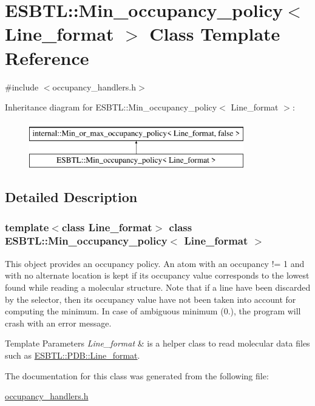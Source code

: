 \hypertarget{classESBTL_1_1Min__occupancy__policy}{}\section{E\+S\+B\+TL\+:\+:Min\+\_\+occupancy\+\_\+policy$<$ Line\+\_\+format $>$ Class Template Reference}
\label{classESBTL_1_1Min__occupancy__policy}


{\ttfamily \#include $<$occupancy\+\_\+handlers.\+h$>$}

Inheritance diagram for E\+S\+B\+TL\+:\+:Min\+\_\+occupancy\+\_\+policy$<$ Line\+\_\+format $>$\+:\begin{figure}[H]
\begin{center}
\leavevmode
\includegraphics[height=2.000000cm]{classESBTL_1_1Min__occupancy__policy}
\end{center}
\end{figure}


\subsection{Detailed Description}
\subsubsection*{template$<$class Line\+\_\+format$>$\newline
class E\+S\+B\+T\+L\+::\+Min\+\_\+occupancy\+\_\+policy$<$ Line\+\_\+format $>$}

This object provides an occupancy policy. An atom with an occupancy != 1 and with no alternate location is kept if its occupancy value corresponds to the lowest found while reading a molecular structure. Note that if a line have been discarded by the selector, then its occupancy value have not been taken into account for computing the minimum. In case of ambiguous minimum (0.), the program will crash with an error message. 
\begin{DoxyTemplParams}{Template Parameters}
{\em Line\+\_\+format} & is a helper class to read molecular data files such as \hyperlink{classESBTL_1_1PDB_1_1Line__format}{E\+S\+B\+T\+L\+::\+P\+D\+B\+::\+Line\+\_\+format}. \\
\hline
\end{DoxyTemplParams}


The documentation for this class was generated from the following file\+:\begin{DoxyCompactItemize}
\item 
\hyperlink{occupancy__handlers_8h}{occupancy\+\_\+handlers.\+h}\end{DoxyCompactItemize}
